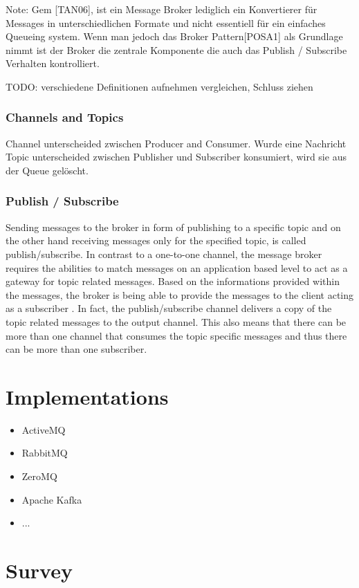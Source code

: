 Note: Gem [TAN06], ist ein Message Broker lediglich ein Konvertierer für
Messages in unterschiedlichen Formate und nicht essentiell für ein einfaches
Queueing system. Wenn man jedoch das Broker Pattern[POSA1] als Grundlage nimmt
ist der Broker die zentrale Komponente die auch das Publish / Subscribe
Verhalten kontrolliert. 

TODO: verschiedene Definitionen aufnehmen vergleichen, Schluss ziehen \\

\subsubsection{Channels and Topics} %
Channel unterscheided zwischen Producer and Consumer. Wurde eine Nachricht
Topic unterscheided zwischen Publisher und Subscriber
konsumiert, wird sie aus der Queue gelöscht. 

\subsubsection{Publish / Subscribe}
Sending messages to the broker in form of publishing to a specific topic and
on the other hand receiving messages only for the specified topic, is called
publish/subscribe.
In contrast to a one-to-one channel, the message broker requires the abilities 
to match messages on an application based level to act as a gateway for topic
related messages. Based on the informations provided within the messages, 
the broker is being able to provide the messages to the client acting as a 
subscriber \cite{TAN06}. In fact, the publish/subscribe channel delivers a copy of the 
topic related messages to the output channel. This also means that there can 
be more than one channel that consumes the topic specific messages and thus there
can be more than one subscriber. \cite{EIP03}

\section{Implementations}
\begin{itemize}
	\item ActiveMQ 
	\item RabbitMQ
	\item ZeroMQ
	\item Apache Kafka
	\item ... 
\end{itemize}
\section{Survey}


